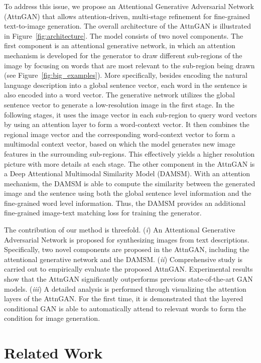 To address this issue, we propose an Attentional Generative Adversarial Network (AttnGAN) that allows attention-driven, multi-stage refinement for fine-grained text-to-image generation. The overall architecture of the AttnGAN is illustrated in Figure~\ref{fig:architecture}. The model consists of two novel components.  The first component is an attentional generative network, in which an attention mechanism is developed for the generator to draw different sub-regions of the image by focusing on words that are most relevant to the sub-region being drawn (see Figure~\ref{fig:big_examples}). More specifically, besides encoding the natural language description into a global sentence vector, each word in the sentence is also encoded into a word vector. The generative network utilizes the global sentence vector to generate a low-resolution image in the first stage. In the following stages, it uses the image vector in each sub-region to query word vectors by using an attention layer to form a word-context vector. It then combines the regional image vector and the corresponding word-context vector to form a multimodal context vector, based on which the model generates new image features in the surrounding sub-regions. This effectively yields a higher resolution picture with more details at each stage. The other component in the AttnGAN is a Deep Attentional Multimodal Similarity Model (DAMSM).   With an attention mechanism, the DAMSM is able to compute the similarity between the generated image and the sentence using both the global sentence level information and the fine-grained word level information. Thus, the DAMSM provides an additional fine-grained image-text matching loss for training the generator. 

The contribution of our method is threefold. 
(\textit{i}) An Attentional Generative Adversarial Network is proposed for synthesizing images from text descriptions. Specifically, two novel components are proposed in the AttnGAN, including the attentional generative network and the DAMSM. 
(\textit{ii}) Comprehensive study is carried out to empirically evaluate the proposed AttnGAN.  Experimental results show that the AttnGAN significantly outperforms previous state-of-the-art GAN models. 
(\textit{iii}) A detailed analysis is performed through visualizing the attention layers of the AttnGAN. For the first time, it is demonstrated that the layered conditional GAN is able to automatically attend to relevant words to form the condition for image generation. 

\section{Related Work}

